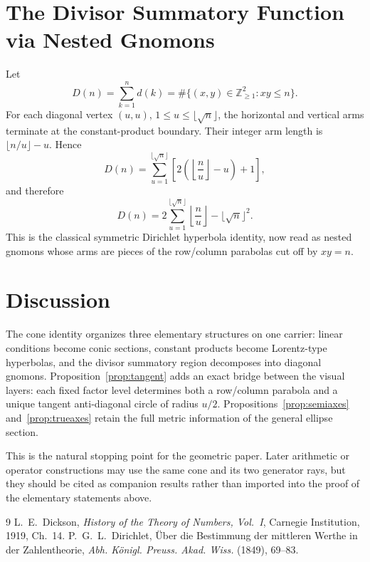 \documentclass[11pt]{amsart}
\theoremstyle{remark}
\begin{document}
\section{The Divisor Summatory Function via Nested Gnomons}
Let
\[
D(n)=\sum_{k=1}^n d(k)=\#\{(x,y)\in\mathbb Z_{\ge1}^2:xy\le n\}.
\]
For each diagonal vertex $(u,u)$, $1\le u\le\lfloor\sqrt n\rfloor$, the horizontal and vertical arms terminate at the constant-product boundary. Their integer arm length is $\lfloor n/u\rfloor-u$. Hence
\begin{equation}
D(n)=\sum_{u=1}^{\lfloor\sqrt n\rfloor}\left[2\left(\left\lfloor\frac nu\right\rfloor-u\right)+1\right], \tag{5.1}
\end{equation}
and therefore
\begin{equation}
D(n)=2\sum_{u=1}^{\lfloor\sqrt n\rfloor}\left\lfloor\frac nu\right\rfloor-\lfloor\sqrt n\rfloor^2. \tag{5.2}
\end{equation}
This is the classical symmetric Dirichlet hyperbola identity, now read as nested gnomons whose arms are pieces of the row/column parabolas cut off by $xy=n$.

\section{Discussion}
The cone identity organizes three elementary structures on one carrier: linear conditions become conic sections, constant products become Lorentz-type hyperbolas, and the divisor summatory region decomposes into diagonal gnomons. Proposition~\ref{prop:tangent} adds an exact bridge between the visual layers: each fixed factor level determines both a row/column parabola and a unique tangent anti-diagonal circle of radius $u/2$. Propositions~\ref{prop:semiaxes} and~\ref{prop:trueaxes} retain the full metric information of the general ellipse section.

This is the natural stopping point for the geometric paper. Later arithmetic or operator constructions may use the same cone and its two generator rays, but they should be cited as companion results rather than imported into the proof of the elementary statements above.

\begin{thebibliography}{9}
 L.~E.~Dickson, \emph{History of the Theory of Numbers, Vol.~I}, Carnegie Institution, 1919, Ch.~14.
 P.~G.~L.~Dirichlet, \"Uber die Bestimmung der mittleren Werthe in der Zahlentheorie, \emph{Abh. K\"onigl. Preuss. Akad. Wiss.} (1849), 69--83.
\end{thebibliography}
\end{document}
